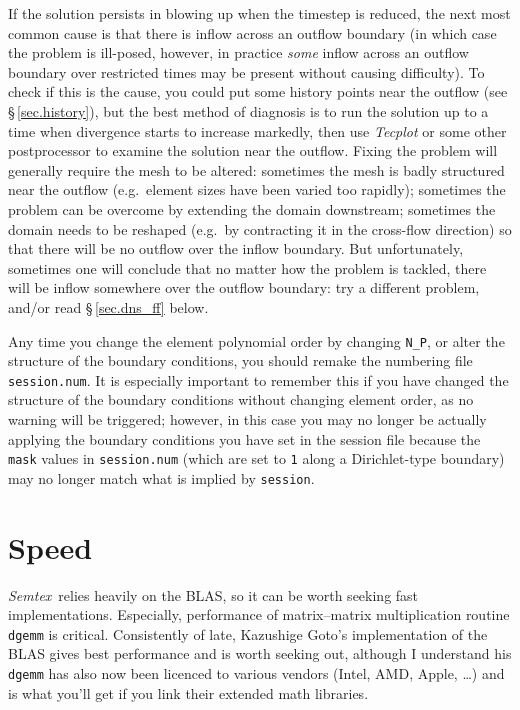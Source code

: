\documentclass[11pt,a4paper]{report}
\newcommand{\Semtex}{\emph{Semtex}}
\begin{document}
If the solution persists in blowing up when the timestep is reduced,
the next most common cause is that there is inflow across an outflow
boundary (in which case the problem is ill-posed, however, in practice
\emph{some} inflow across an outflow boundary over restricted times
may be present without causing difficulty). To check if this is the
cause, you could put some history points near the outflow (see
\S\,\ref{sec.history}), but the best method of diagnosis is to run the
solution up to a time when divergence starts to increase markedly,
then use \emph{Tecplot} or some other postprocessor to examine the
solution near the outflow. Fixing the problem will generally require
the mesh to be altered: sometimes the mesh is badly structured near
the outflow (e.g.\ element sizes have been varied too rapidly);
sometimes the problem can be overcome by extending the domain
downstream; sometimes the domain needs to be reshaped (e.g.\ by
contracting it in the cross-flow direction) so that there will be no
outflow over the inflow boundary. But unfortunately, sometimes one
will conclude that no matter how the problem is tackled, there will be
inflow somewhere over the outflow boundary: try a different problem,
and/or read \S\,\ref{sec.dns_ff} below.

Any time you change the element polynomial order by changing
\verb+N_P+, or alter the structure of the boundary conditions, you
should remake the numbering file \verb+session.num+. It is especially
important to remember this if you have changed the structure of the
boundary conditions without changing element order, as no warning will
be triggered; however, in this case you may no longer be actually
applying the boundary conditions you have set in the session file
because the \verb+mask+ values in \texttt{session.num} (which are set
to \verb+1+ along a Dirichlet-type boundary) may no longer match what
is implied by \texttt{session}.

\section{Speed}
\label{sec.speed}

\Semtex\ relies heavily on the BLAS, so it can be worth seeking fast
implementations. Especially, performance of matrix--matrix
multiplication routine \verb+dgemm+ is critical. Consistently of late,
Kazushige Goto's implementation of the BLAS gives best performance and
is worth seeking out, although I understand his \verb+dgemm+ has also
now been licenced to various vendors (Intel, AMD, Apple, \ldots) and
is what you'll get if you link their extended math libraries.
\end{document}
